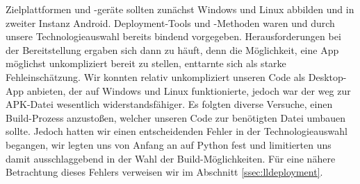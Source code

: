 		\noindent Zielplattformen und -geräte sollten zunächst Windows und Linux abbilden und in zweiter Instanz Android. Deployment-Tools und -Methoden waren und durch unsere Technologieauswahl bereits bindend vorgegeben. Herausforderungen bei der Bereitstellung ergaben sich dann zu häuft, denn die Möglichkeit, eine App möglichst unkompliziert bereit zu stellen, enttarnte sich als starke Fehleinschätzung. Wir konnten relativ unkompliziert unseren Code als Desktop-App anbieten, der auf Windows und Linux funktionierte, jedoch war der weg zur APK-Datei wesentlich widerstandsfähiger. Es folgten diverse Versuche, einen Build-Prozess anzustoßen, welcher unseren Code zur benötigten Datei umbauen sollte. Jedoch hatten wir einen entscheidenden Fehler in der Technologieauswahl begangen, wir legten uns von Anfang an auf Python fest und limitierten uns damit ausschlaggebend in der Wahl der Build-Möglichkeiten. Für eine nähere Betrachtung dieses Fehlers verweisen wir im Abschnitt \ref{ssec:lldeployment}.
